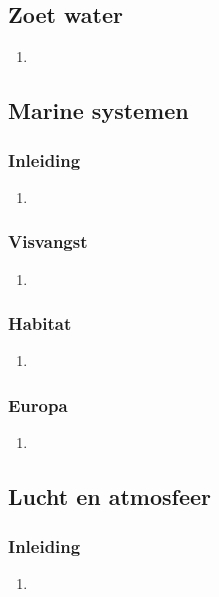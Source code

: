 \documentclass[12pt]{article}
\begin{document}
    \subsection{Zoet water}
    \begin{enumerate}
        \item 
    \end{enumerate}


    \subsection{Marine systemen}
    \subsubsection{Inleiding}
    \begin{enumerate}
        \item 
    \end{enumerate}

    \subsubsection{Visvangst}
    \begin{enumerate}
        \item 
    \end{enumerate}

    \subsubsection{Habitat}
    \begin{enumerate}
        \item 
    \end{enumerate}

    \subsubsection{Europa}
    \begin{enumerate}
        \item 
    \end{enumerate}


    \subsection{Lucht en atmosfeer}
    \subsubsection{Inleiding}
    \begin{enumerate}
        \item 
    \end{enumerate}
\end{document}
